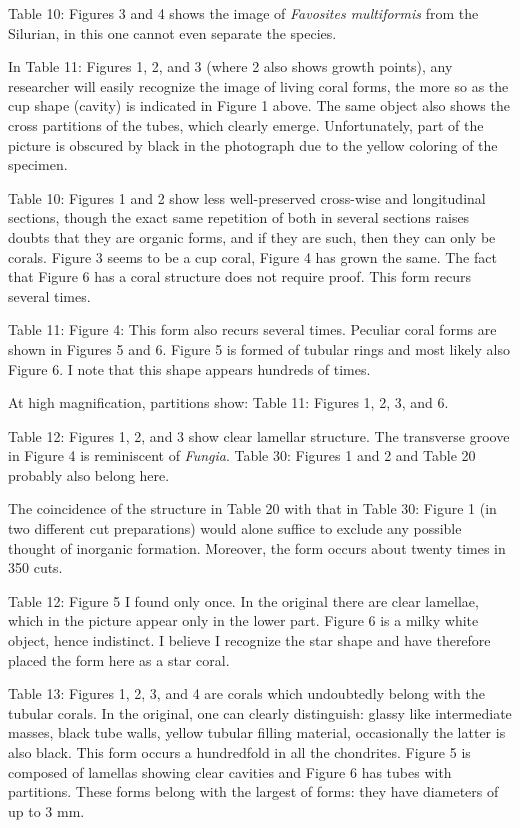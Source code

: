 \documentclass[a4paper, 12pt, oneside]{article}
\begin{document}
Table 10: Figures 3 and 4 shows the image of \emph{Favosites multiformis} from the Silurian, in this one cannot even separate the species.

In Table 11: Figures 1, 2, and 3 (where 2 also shows growth points), any researcher will easily recognize the image of living coral forms, the more so as the cup shape (cavity) is indicated in Figure 1 above. The same object also shows the cross partitions of the tubes, which clearly emerge. Unfortunately, part of the picture is obscured by black in the photograph due to the yellow coloring of the specimen.

Table 10: Figures 1 and 2 show less well-preserved cross-wise and longitudinal sections, though the exact same repetition of both in several sections raises doubts that they are organic forms, and if they are such, then they can only be corals. Figure 3 seems to be a cup coral, Figure 4 has grown the same. The fact that Figure 6 has a coral structure does not require proof. This form recurs several times.

Table 11: Figure 4: This form also recurs several times. Peculiar coral forms are shown in Figures 5 and 6. Figure 5 is formed of tubular rings and most likely also Figure 6. I note that this shape appears hundreds of times.

At high magnification, partitions show: Table 11: Figures 1, 2, 3, and 6.

Table 12: Figures 1, 2, and 3 show clear lamellar structure. The transverse groove in Figure 4 is reminiscent of \emph{Fungia}. Table 30: Figures 1 and 2 and Table 20 probably also belong here.

The coincidence of the structure in Table 20 with that in Table 30: Figure 1 (in two different cut preparations) would alone suffice to exclude any possible thought of inorganic formation. Moreover, the form occurs about twenty times in 350 cuts.

Table 12: Figure 5 I found only once. In the original there are clear lamellae, which in the picture appear only in the lower part. Figure 6 is a milky white object, hence indistinct. I believe I recognize the star shape and have therefore placed the form here as a star coral.

Table 13: Figures 1, 2, 3, and 4 are corals which undoubtedly belong with the tubular corals. In the original, one can clearly distinguish: glassy like intermediate masses, black tube walls, yellow tubular filling material, occasionally the latter is also black. This form occurs a hundredfold in all the chondrites. Figure 5 is composed of lamellas showing clear cavities and Figure 6 has tubes with partitions. These forms belong with the largest of forms: they have diameters of up to 3 mm.
\end{document}
